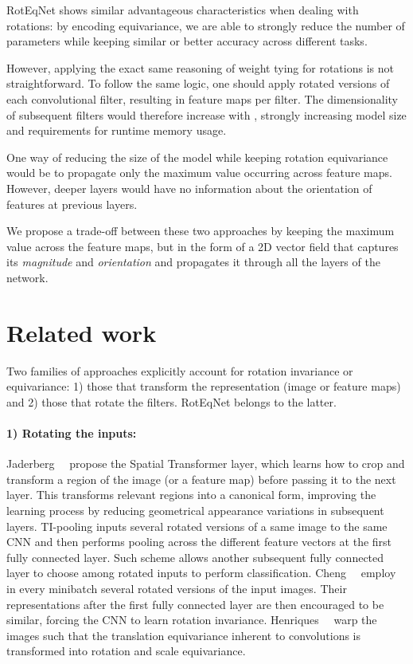 \documentclass[10pt,twocolumn,letterpaper,table]{article}
\begin{document}
RotEqNet shows similar advantageous characteristics when dealing with rotations: by encoding equivariance, we are able to strongly reduce the number of parameters while keeping similar or better accuracy across different tasks.
	
However, applying the exact same reasoning of weight tying for rotations is not straightforward. To follow the same logic, one should apply  rotated versions of each convolutional filter, resulting in  feature maps per filter. The dimensionality of subsequent filters would therefore increase with , strongly increasing model size and requirements for runtime memory usage.
	
One way of reducing the size of the model while keeping rotation equivariance would be to propagate only the maximum value occurring across  feature maps. However, deeper layers would have no information about the orientation of features at previous layers.

We propose a trade-off between these two approaches by keeping the maximum value across the  feature maps, but in the form of a 2D vector field that captures its \emph{magnitude} and \emph{orientation} and propagates it through all the layers of the network.

\section{Related work}

Two families of approaches explicitly account for rotation invariance or equivariance: 1) those that transform the representation (image or feature maps) and 2) those that rotate the filters. RotEqNet belongs to the latter.
	
\vspace*{-3mm}
	
\paragraph{1) Rotating the inputs:}
Jaderberg~\etal~\cite{jaderberg2015spatial} propose the Spatial Transformer layer, which learns how to crop and transform a region of the image (or a feature map) before passing it to the next layer. This transforms relevant regions into a canonical form, improving the learning process by reducing geometrical appearance variations in subsequent layers.
TI-pooling \cite{laptev2016ti} inputs several rotated versions of a same image to the same CNN and then performs pooling across the different feature vectors at the first fully connected layer. Such scheme allows another subsequent fully connected layer to choose among rotated inputs to perform classification. 
Cheng~\etal~\cite{cheng2016rifd} employ in every minibatch several rotated versions of the input images. Their representations after the first fully connected layer are then encouraged to be similar, forcing the CNN to learn rotation invariance.
Henriques~\etal~\cite{henriques2016warped} warp the images such that the translation equivariance inherent to convolutions is transformed into rotation and scale equivariance.
\end{document}
